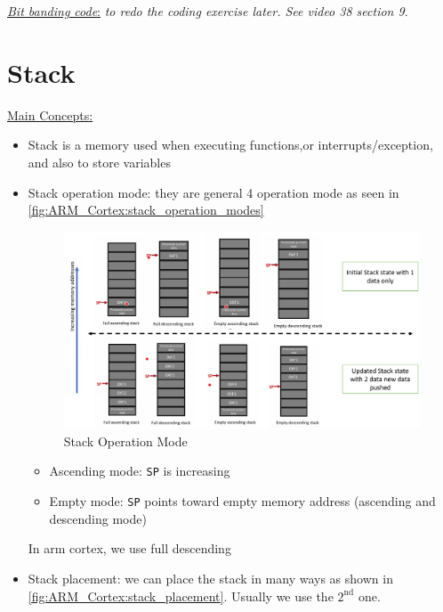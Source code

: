  \underline{\textit{Bit banding code}:} \textit{to redo the coding exercise later. See video 38 section 9}. 

\newpage
\section{Stack}

\underline{Main Concepts:}

\begin{itemize}

\item Stack is a memory used when executing functions,or interrupts/exception, and also to store variables

\item Stack operation mode: they are general 4 operation mode as seen in \autoref{fig:ARM_Cortex:stack_operation_modes}


\begin{figure}[h]
\centering
\includegraphics[scale=0.5]{Figures/ARM_Cortex/stack_operation_modes}
\caption{Stack Operation Mode}
\label{fig:ARM_Cortex:stack_operation_modes}
\end{figure}

\begin{itemize}
    \item Ascending mode: \verb|SP| is increasing

    \item Empty mode: \verb|SP| points toward empty memory address (ascending and descending mode)
\end{itemize}


In arm cortex, we use full descending


\newpage

\item Stack placement: we can place the stack in many ways as shown in \autoref{fig:ARM_Cortex:stack_placement}. Usually we use the $\mathrm{2}^\mathrm{nd}$ one.



\end{itemize}
